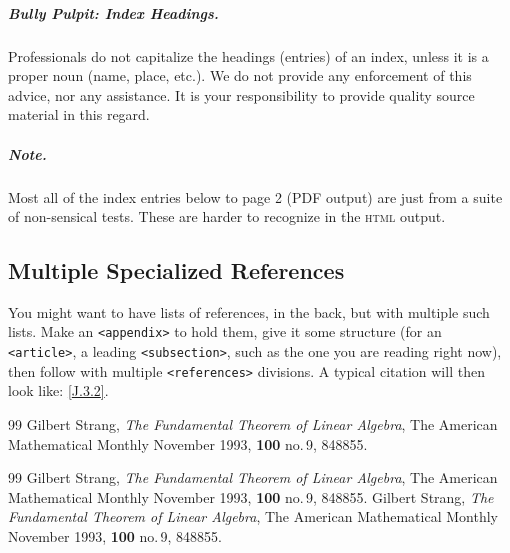\documentclass{sn-jnl}
\theoremstyle{thmstyleone}%
\theoremstyle{thmstyletwo}%
\theoremstyle{thmstylethree}%
\newcommand{\xreffont}{\relax}
\newcommand{\mono}[1]{\texttt{#1}}
\newcommand{\initialism}[1]{\textsc{\MakeLowercase{#1}}}
\numberwithin{equation}{section}
\begin{document}
\begin{appendices}
\subparagraph*{Bully Pulpit: Index Headings.}\label{appendix-index-5}%
Professionals do not capitalize the headings (entries) of an index, unless it is a proper noun (name, place, etc.\@).  We do not provide any enforcement of this advice, nor any assistance.  It is your responsibility to provide quality source material in this regard.%
\subparagraph*{Note.}\label{appendix-index-6}%
Most all of the index entries below to page 2 (PDF output) are just from a suite of non-sensical tests.  These are harder to recognize in the \initialism{HTML} output.%
%
%
\typeout{************************************************}
\typeout{************************************************}
%
\label{appendix-multiple-references}%
%
%
\typeout{************************************************}
\typeout{************************************************}
%
\subsection{Multiple Specialized References}\label{appendix-multiple-references-2}%
You might want to have lists of references, in the back, but with multiple such lists.  Make an \mono{<appendix>} to hold them, give it some structure (for an \mono{<article>}, a leading \mono{<subsection>}, such as the one you are reading right now), then follow with multiple \mono{<references>} divisions.  A typical citation will then look like: \hyperlink{biblio-strang-article-tres}{[{\xreffont J.3.2}]}.%
%
%
\typeout{************************************************}
\typeout{************************************************}
%

\begin{thebibliography}{99}
\hypertarget{biblio-strang-article-uno}{}Gilbert Strang, \textit{The Fundamental Theorem of Linear Algebra}, The American Mathematical Monthly November 1993, \textbf{100} no.\@\,9, 848\textendash{}855.
\end{thebibliography}
%
%
\typeout{************************************************}
\typeout{************************************************}
%

\begin{thebibliography}{99}
\hypertarget{biblio-strang-article-dos}{}Gilbert Strang, \textit{The Fundamental Theorem of Linear Algebra}, The American Mathematical Monthly November 1993, \textbf{100} no.\@\,9, 848\textendash{}855.
\hypertarget{biblio-strang-article-tres}{}Gilbert Strang, \textit{The Fundamental Theorem of Linear Algebra}, The American Mathematical Monthly November 1993, \textbf{100} no.\@\,9, 848\textendash{}855.
\end{thebibliography}
\end{appendices}%
%
\end{document}
